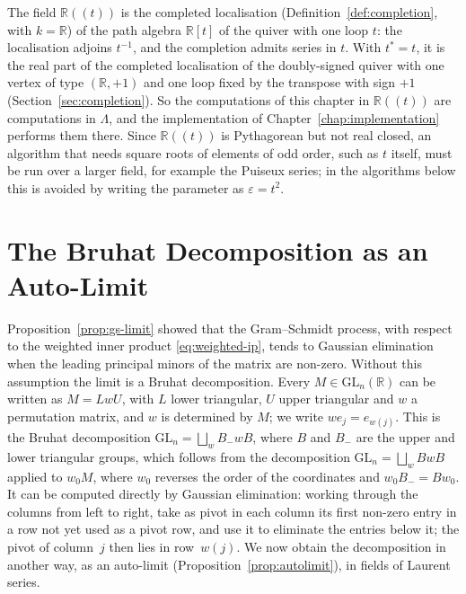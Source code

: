 \documentclass[12pt, a4paper]{report}
\theoremstyle{plain}
\theoremstyle{definition}
\theoremstyle{remark}
\theoremstyle{plain}
\newcommand{\RR}{\mathbb{R}}
\newcommand{\GL}{\mathrm{GL}}
\begin{document}
The field $\RR((t))$ is the completed localisation (Definition~\ref{def:completion}, with $k=\RR$) of the path algebra $\RR[t]$ of the quiver with one loop $t$: the localisation adjoins $t^{-1}$, and the completion admits series in $t$. With $t^*=t$, it is the real part of the completed localisation of the doubly-signed quiver with one vertex of type $(\RR,+1)$ and one loop fixed by the transpose with sign $+1$ (Section~\ref{sec:completion}). So the computations of this chapter in $\RR((t))$ are computations in $\Lambda$, and the implementation of Chapter~\ref{chap:implementation} performs them there. Since $\RR((t))$ is Pythagorean but not real closed, an algorithm that needs square roots of elements of odd order, such as $t$ itself, must be run over a larger field, for example the Puiseux series; in the algorithms below this is avoided by writing the parameter as $\varepsilon=t^2$.

\section{The Bruhat Decomposition as an Auto-Limit}
\label{sec:bruhat}
Proposition~\ref{prop:gs-limit} showed that the Gram--Schmidt process, with respect to the weighted inner product \eqref{eq:weighted-ip}, tends to Gaussian elimination when the leading principal minors of the matrix are non-zero. Without this assumption the limit is a Bruhat decomposition. Every $M\in\GL_n(\RR)$ can be written as $M=LwU$, with $L$ lower triangular, $U$ upper triangular and $w$ a permutation matrix, and $w$ is determined by $M$; we write $we_j=e_{w(j)}$. This is the Bruhat decomposition $\GL_n=\bigsqcup_wB_-wB$, where $B$ and $B_-$ are the upper and lower triangular groups, which follows from the decomposition $\GL_n=\bigsqcup_wBwB$~\cite{Humphreys1975} applied to $w_0M$, where $w_0$ reverses the order of the coordinates and $w_0B_-=Bw_0$. It can be computed directly by Gaussian elimination: working through the columns from left to right, take as pivot in each column its first non-zero entry in a row not yet used as a pivot row, and use it to eliminate the entries below it; the pivot of column~$j$ then lies in row~$w(j)$. We now obtain the decomposition in another way, as an auto-limit (Proposition~\ref{prop:autolimit}), in fields of Laurent series.
\end{document}
